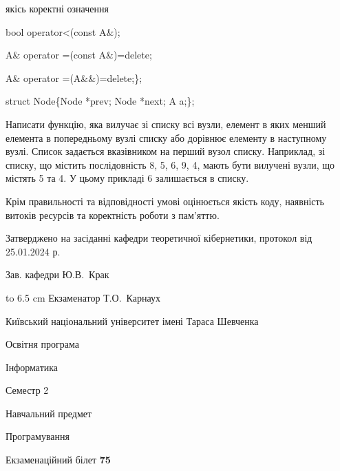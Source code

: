 \documentclass[12pt, ukrainian]{article}
\begin{document}
{\quad  якісь коректні означення 

\quad  bool operator<(const A\&); 

\quad A\& operator =(const A\&)=delete; 

\quad  A\& operator =(A\&\&)=delete;\};

struct Node\{Node *prev; Node *next; A a;\};

Написати функцію, яка вилучає зі списку всі вузли, елемент в яких менший елемента в попередньому вузлі списку або дорівнює елементу в наступному вузлі. Список задається вказівником на перший вузол списку. Наприклад, зі списку, що містить послідовність 8, 5, 6, 9, 4, мають бути вилучені вузли, що містять 5 та 4. У цьому прикладі 6 залишається в списку.

Крім правильності та відповідності умові оцінюється якість коду, наявність витоків ресурсів та коректність роботи з пам'яттю. 

}
{\smallskip\smallskip \begin {scriptsize} Затверджено на засіданні кафедри теоретичної кібернетики, протокол   від   25.01.2024 р.\par\smallskip\smallskip\smallskip\smallskip
{\parbox {6.5 cm} {Зав. кафедри \dotfill Ю.В.~Крак}}\hspace {0.7cm} {\hbox to 6.5 cm { Екзаменатор \dotfill Т.О.~Карнаух}} \end{scriptsize}}
\newpage
{{\begin {scriptsize}\par
{ \center  Київський національний університет імені Тараса Шевченка \par}
{\parbox {5 cm}{Освітня програма \hfill}{\parbox {7 cm}{Інформатика\hfill}}\parbox {6 cm}{\hfill Семестр 2}}\par
{\parbox {5 cm} {Навчальний предмет \hfill}\parbox {7 cm}{Програмування \hfill}\parbox {6cm}{\hfill}\par}\vspace{-15pt} \end{scriptsize}}{\center Екзаменаційний білет \No \textbf { 75 }\par}}
\end{document}
